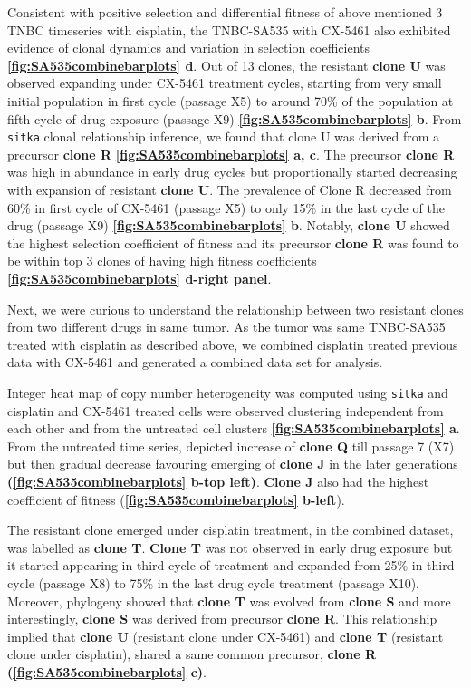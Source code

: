 Consistent with positive selection and differential fitness of above mentioned 3 TNBC timeseries with cisplatin, the TNBC-SA535 with CX-5461 also exhibited evidence of clonal dynamics and variation in selection coefficients \textbf{\autoref{fig:SA535combinebarplots} d}. Out of 13 clones, the resistant \textbf{clone U} was observed expanding under CX-5461 treatment cycles, starting from very small initial population in first cycle (passage X5) to around 70\% of the population at fifth cycle of drug exposure (passage X9) \textbf{\autoref{fig:SA535combinebarplots} b}. From \texttt{sitka} clonal relationship inference, we found that clone U was derived from a precursor \textbf{clone R} \textbf{\autoref{fig:SA535combinebarplots} a, c}. The precursor \textbf{clone R} was high in abundance in early drug cycles but proportionally started decreasing with expansion of resistant \textbf{clone U}. The prevalence of Clone R decreased from 60\% in first cycle of CX-5461 (passage X5) to only 15\% in the last cycle of the drug (passage X9) \textbf{\autoref{fig:SA535combinebarplots} b}. 
Notably, \textbf{clone U} showed the highest selection coefficient of fitness and its precursor \textbf{clone R} was found to be within top 3 clones of having high fitness coefficients \textbf{\autoref{fig:SA535combinebarplots} d-right panel}.  

Next, we were curious to understand the relationship between two resistant clones from two different drugs in same tumor. As the tumor was same TNBC-SA535 treated with cisplatin as described above, we combined cisplatin treated previous data with CX-5461 and generated a combined data set for analysis. 

Integer heat map of copy number heterogeneity was computed using \texttt{sitka} and cisplatin and CX-5461 treated cells were observed clustering independent from each other and from the untreated cell clusters \textbf{\autoref{fig:SA535combinebarplots} a}.
From the untreated time series, depicted increase of \textbf{clone Q} till passage 7 (X7) but then gradual decrease favouring emerging of \textbf{clone J} in the later generations \textbf{(\autoref{fig:SA535combinebarplots} b-top left)}. \textbf{Clone J} also had the highest coefficient of fitness (\textbf{\autoref{fig:SA535combinebarplots} b-left}).


The resistant clone emerged under cisplatin treatment, in the combined dataset, was labelled as \textbf{clone T}. \textbf{Clone T} was not observed in early drug exposure but it started appearing in third cycle of treatment and expanded from 25\% in third cycle (passage X8) to 75\% in the last drug cycle treatment (passage X10). Moreover, phylogeny showed that \textbf{clone T} was evolved from \textbf{clone S} and more interestingly, \textbf{clone S} was derived from precursor \textbf{clone R}. This relationship implied that \textbf{clone U} (resistant clone under CX-5461) and \textbf{clone T} (resistant clone under cisplatin), shared a same common precursor, \textbf{clone R} \textbf{(\autoref{fig:SA535combinebarplots} c)}.


